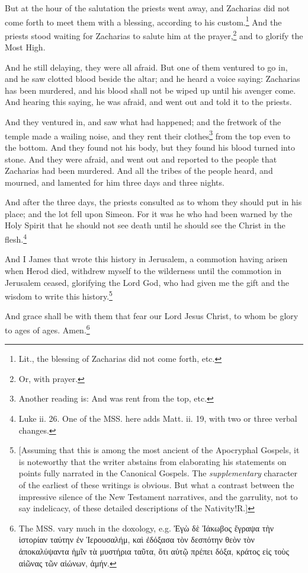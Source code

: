 \pend\pstart
{}

\pend\setcounter{pstartR}{1}\pstart
But at the hour of the salutation the priests went away, and Zacharias did not come forth to meet them with a blessing, according to his custom.\footnote{Lit., the blessing of Zacharias did not come forth, etc.} And the priests stood waiting for Zacharias to salute him at the prayer,\footnote{Or, with prayer.} and to glorify the Most High.

\pend\pstart
And he still delaying, they were all afraid. But one of them ventured to go in, and he saw clotted blood beside the altar; and he heard a voice saying: Zacharias has been murdered, and his blood shall not be wiped up until his avenger come. And hearing this saying, he was afraid, and went out and told it to the priests.

\pend\pstart
And they ventured in, and saw what had happened; and the fretwork of the temple made a wailing noise, and they rent their clothes\footnote{Another reading is: And was rent from the top, etc.} from the top even to the bottom. And they found not his body, but they found his blood turned into stone. And they were afraid, and went out and reported to the people that Zacharias had been murdered. And all the tribes of the people heard, and mourned, and lamented for him three days and three nights.

\pend\pstart
And after the three days, the priests consulted as to whom they should put in his place; and the lot fell upon Simeon. For it was he who had been warned by the Holy Spirit that he should not see death until he should see the Christ in the flesh.\footnote{Luke ii. 26. One of the MSS. here adds Matt. ii. 19, with two or three verbal changes.}

\pend\pstart
{}

\pend\setcounter{pstartR}{1}\pstart
And I James that wrote this history in Jerusalem, a commotion having arisen when Herod died, withdrew myself to the wilderness until the commotion in Jerusalem ceased, glorifying the Lord God, who had given me the gift and the wisdom to write this history.\footnote{[Assuming that this is among the most ancient of the Apocryphal Gospels, it is noteworthy that the writer abstains from elaborating his statements on points fully narrated in the Canonical Gospels. The \textit{supplementary} character of the earliest of these writings is obvious. But what a contrast between the impressive silence of the New Testament narratives, and the garrulity, not to say indelicacy, of these detailed descriptions of the Nativity!\textemdash R.]}

\pend\pstart
And grace shall be with them that fear our Lord Jesus Christ, to whom be glory to ages of ages. Amen.\footnote{The MSS. vary much in the doxology, e.g. {\greekfont Ἐγὼ δὲ Ἰάκωβος ἔγραψα τὴν ἱστορίαν ταύτην ἐν Ἱερουσαλήμ, καὶ ἐδόξασα τὸν δεσπότην θεὸν τὸν ἀποκαλύψαντα ἡμῖν τὰ μυστήρια ταῦτα, ὅτι αὐτῷ πρέπει δόξα, κράτος εἰς τοὺς αἰῶνας τῶν αἰώνων, ἀμήν.}}

\pend

